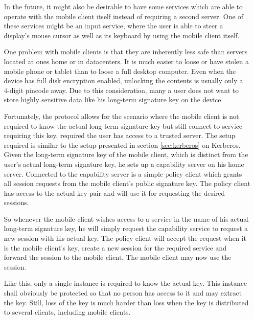 In the future, it might also be desirable to have some services which are able to operate with the mobile client itself instead of requiring a second server.
One of these services might be an input service, where the user is able to steer a display's mouse cursor as well as its keyboard by using the mobile client itself.

\bigskip

One problem with mobile clients is that they are inherently less safe than servers located at ones home or in datacenters.
It is much easier to loose or have stolen a mobile phone or tablet than to loose a full desktop computer.
Even when the device has full disk encryption enabled, unlocking the contents is usually only a 4-digit pincode away.
Due to this consideration, many a user does not want to store highly sensitive data like his long-term signature key on the device.

Fortunately, the protocol allows for the scenario where the mobile client is not required to know the actual long-term signature key but still connect to service requiring this key, required the user has access to a trusted server.
The setup required is similar to the setup presented in section \ref{sec:kerberos} on Kerberos.
Given the long-term signature key of the mobile client, which is distinct from the user's actual long-term signature key, he sets up a capability server on his home server.
Connected to the capability server is a simple policy client which grants all session requests from the mobile client's public signature key.
The policy client has access to the actual key pair and will use it for requesting the desired sessions.

So whenever the mobile client wishes access to a service in the name of his actual long-term signature key, he will simply request the capability service to request a new session with his actual key.
The policy client will accept the request when it is the mobile client's key, create a new session for the required service and forward the session to the mobile client.
The mobile client may now use the session.

Like this, only a single instance is required to know the actual key.
This instance shall obviously be protected so that no person has access to it and may extract the key.
Still, loss of the key is much harder than loss when the key is distributed to several clients, including mobile clients.

